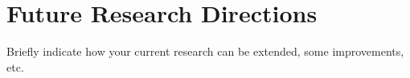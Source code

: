 

\chapter{Future Research Directions} %

Briefly indicate how your current research can be extended, some improvements, etc.

















\ifpdf
    \graphicspath{{8/figures/PNG/}{8/figures/PDF/}{8/figures/}}
\else
    \graphicspath{{8/figures/EPS/}{8/figures/}}
\fi
















